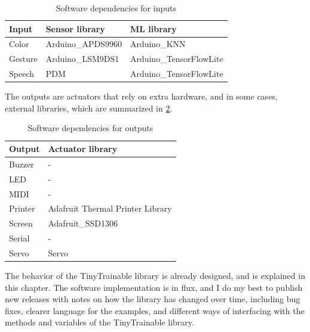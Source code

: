 \begin{table}[ht]
    \centering
    \begin{tabular}{ | l | l | l |}
        \hline
        \textbf{Input}  & \textbf{Sensor library} & \textbf{\acrshort{ML} library} \\
        \hline
        Color &  Arduino{\_}APDS9960 & Arduino{\_}KNN \\
        \hline
        Gesture & Arduino{\_}LSM9DS1 & Arduino{\_}TensorFlowLite \\
        \hline
        Speech & PDM & Arduino{\_}TensorFlowLite \\
        \hline
    \end{tabular}
    \caption{Software dependencies for inputs}
    \label{software-dependencies-inputs}
\end{table}{}

The outputs are actuators that  rely on extra hardware, and in some cases, external libraries, which are summarized in \ref{software-dependencies-outputs}.

\begin{table}[ht]
    \centering
    \begin{tabular}{ | l | l | }
        \hline
        \textbf{Output}  & \textbf{Actuator library} \\
        \hline
        Buzzer & - \\
        \hline
        \acrshort{LED} & - \\
        \hline
        \acrshort{MIDI} & - \\
        \hline
        Printer & Adafruit Thermal Printer Library\\
        \hline
        Screen & Adafruit{\_}SSD1306\\ 
        \hline
        Serial & - \\
        \hline
        Servo & Servo\\
        \hline
    \end{tabular}
    \caption{Software dependencies for outputs}
    \label{software-dependencies-outputs}
\end{table}{}

The behavior of the TinyTrainable library is already designed, and is explained in this chapter. The software implementation is in flux, and I do my best to publish new releases with notes on how the library has changed over time, including bug fixes, clearer language for the examples, and different ways of interfacing with the methods and variables of the TinyTrainable library.

